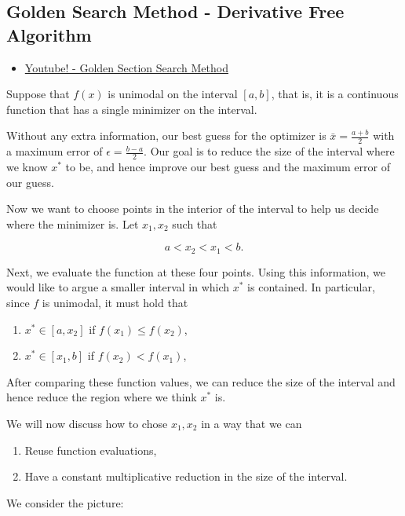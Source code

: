 \subsection{Golden Search Method - Derivative Free Algorithm}
\begin{resource}
\begin{itemize}
\item \href{https://www.youtube.com/watch?v=hLm8xfwWYPw}{Youtube! - Golden Section Search Method}
\end{itemize}
\end{resource}

Suppose that $f(x)$ is unimodal on the interval $[a,b]$, that is, it is a continuous function that has a single minimizer on the interval.  

Without any extra information, our best guess for the optimizer is $\bar x = \tfrac{a+ b}{2}$ with a maximum error of $\epsilon = \tfrac{b-a}{2}$.    Our goal is to reduce the size of the interval where we know $x^*$ to be, and hence improve our best guess and the maximum error of our guess.


 Now we want to choose points in the interior of the interval to help us decide where the minimizer is.  Let $x_1, x_2$ such that 

$$
a < x_2 < x_1 < b.
$$

Next, we evaluate the function at these four points.  Using this information, we would like to argue a smaller interval in which $x^*$ is contained.  In particular, since $f$ is unimodal, it must hold that 
\begin{enumerate}
\item $x^* \in [a, x_2]$ if  $f(x_1) \leq f(x_2)$, 
\item $x^* \in [x_1,b]$ if $f(x_2) < f(x_1)$,
\end{enumerate}


After comparing these function values, we can reduce the size of the interval and hence reduce the region where we think $x^*$ is.   


We will now discuss how to chose $x_1,x_2$ in a way that we can 
\begin{enumerate}
\item Reuse function evaluations,
\item Have a constant multiplicative reduction in the size of the interval.
\end{enumerate}


We consider the picture:\\

